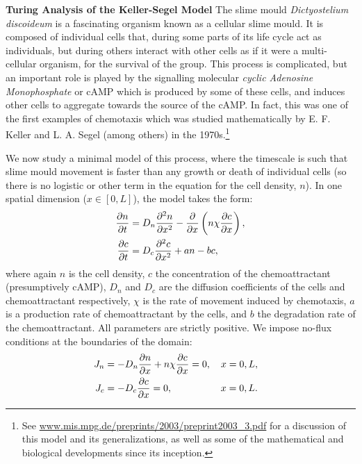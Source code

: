 \documentclass[a4paper,12pt]{article}
\begin{document}
 
%
\newcommand{\sol}[1]{\\ \hrule\hfill \\ \textcolor{blue}{\textbf{SOLUTION:}} #1 \\ \hrule\hfill}
\renewcommand*{\thefootnote}{\arabic{footnote}}


\textbf{Turing Analysis of the Keller-Segel Model} \quad The slime mould \emph{Dictyostelium discoideum} is a fascinating organism known as a cellular slime mould. It is composed of individual cells that, during some parts of its life cycle act as individuals, but during others interact with other cells as if it were a multi-cellular organism, for the survival of the group. This process is complicated, but an important role is played by the signalling molecular \emph{cyclic Adenosine Monophosphate} or cAMP which is produced by some of these cells, and induces other cells to aggregate towards the source of the cAMP. In fact, this was one of the first examples of chemotaxis which was studied mathematically by E. F. Keller and L. A. Segel (among others) in the 1970s.\footnote{See \url{www.mis.mpg.de/preprints/2003/preprint2003_3.pdf} for a discussion of this model and its generalizations, as well as some of the mathematical and biological developments since its inception.}

We now study a minimal model of this process, where the timescale is such that slime mould movement is faster than any growth or death of individual cells (so there is no logistic or other term in the equation for the cell density, $n$). In one spatial dimension ($x \in [0,L]$), the model takes the form:
\begin{align*}
        \pd{n}{t} &= D_n\pdd{n}{x} - \pd{}{x}  \left(n\chi \pd{c}{x}\right),\\
        \pd{c}{t} &= D_c\pdd{c}{x} + an - bc,
\end{align*}
where again $n$ is the cell density, $c$ the concentration of the chemoattractant (presumptively cAMP), $D_n$ and $D_c$ are the diffusion coefficients of the cells and chemoattractant respectively, $\chi$ is the  rate of movement induced by chemotaxis,  $a$ is a production rate of chemoattractant by the cells, and $b$ the degradation rate of the chemoattractant. All parameters are strictly positive. We impose no-flux conditions at the boundaries of the domain:
\begin{align*}
     {J_n} &= -D_n\pd{n}{x} + n\chi  \pd{c}{x} = 0, \quad x=0,L,&\\
     {J_c} &= -D_c \pd{c}{x} = 0,\quad \quad\quad\quad\quad x=0,L.&
\end{align*}
\end{document}
